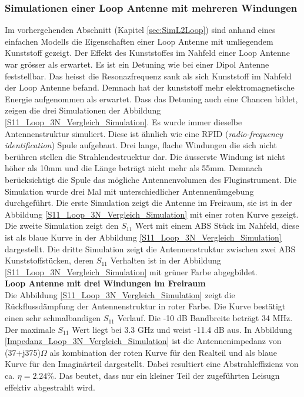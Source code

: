 \subsubsection{Simulationen einer Loop Antenne mit mehreren Windungen}
Im vorhergehenden Abschnitt (Kapitel \ref{sec:SimL2Loop}) sind anhand eines einfachen Modells die Eigenschaften einer Loop Antenne mit umliegendem Kunststoff gezeigt. Der Effekt des Kunststoffes im Nahfeld einer Loop Antenne war grösser als erwartet. Es ist ein Detuning wie bei einer Dipol Antenne feststellbar. Das heisst die Resonazfrequenz sank als sich Kunststoff im Nahfeld der Loop Antenne befand. Demnach hat der kunststoff mehr elektromagnetische Energie aufgenommen als erwartet. Dass das Detuning auch eine Chancen bildet, zeigen die drei Simulationen der Abbildung \ref{S11_Loop_3N_Vergleich_Simulation}. Es wurde immer dieselbe Antennenstruktur simuliert. Diese ist ähnlich wie eine RFID (\textit{radio-frequency identification}) Spule aufgebaut. Drei lange, flache Windungen die sich nicht berühren stellen die Strahlendestrucktur dar. Die äusserste Windung ist nicht höher als 10mm und die Länge beträgt nicht mehr als 55mm. Demnach  berücksichtigt die Spule das mögliche Antennenvolumen des Fluginstrument. Die Simulation wurde drei Mal mit unterschiedlicher Antennenümgebung durchgeführt. Die erste Simulation zeigt die Antenne im Freiraum, sie ist in der Abbildung \ref{S11_Loop_3N_Vergleich_Simulation} mit einer roten Kurve gezeigt. Die zweite Simulation zeigt den $S_{11}$ Wert mit einem ABS Stück im Nahfeld, diese ist als blaue Kurve in der Abbildung \ref{S11_Loop_3N_Vergleich_Simulation} dargestellt. Die dritte Simulation zeigt die Antennenstruktur zwischen zwei ABS Kunststoffstücken, deren $S_{11}$ Verhalten ist in der Abbildung \ref{S11_Loop_3N_Vergleich_Simulation} mit grüner Farbe abgegbildet.\\

\textbf{Loop Antenne mit drei Windungen im Freiraum}\\
Die Abbildung \ref{S11_Loop_3N_Vergleich_Simulation} zeigt die Rückflussdämpfung der Antennenstruktur in roter Farbe. Die Kurve bestätigt  einen sehr schmalbandigen $S_{11}$ Verlauf. Die -10 dB Bandbreite beträgt 34 MHz. Der maximale $S_{11}$ Wert liegt bei 3.3 GHz und weist -11.4 dB aus. In Abbildung \ref{Impedanz_Loop_3N_Vergleich_Simulation} ist die Antennenimpedanz von (37+j375)$\Omega$ als kombination der roten Kurve für den Realteil und als blaue Kurve für den Imaginärteil dargestellt. Dabei resultiert eine Abstrahleffizienz von ca. $\eta=2.24\%$. Das beutet, dass nur ein kleiner Teil der zugeführten Leisugn effektiv abgestrahlt wird.\\

